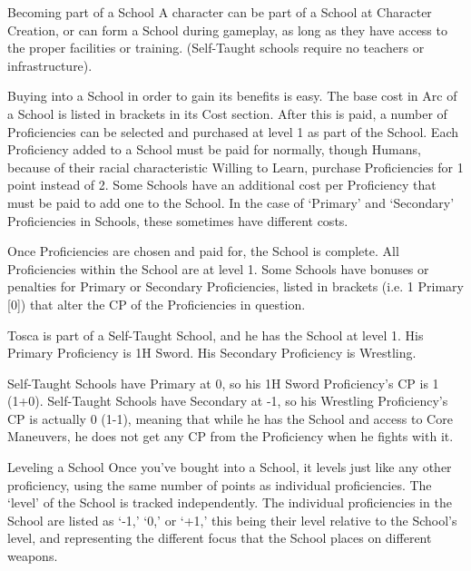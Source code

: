 \documentclass[oneside,11pt,english]{book}
\begin{document}
 

Becoming part of a School 
A character can be part of a School at Character Creation, or can form a School during gameplay, as long 
as they have access to the proper facilities or training. (Self-Taught schools require no teachers or 
infrastructure). 

 

Buying into a School in order to gain its benefits is easy. The base cost in Arc of a School is listed in 
brackets in its Cost section. After this is paid, a number of Proficiencies can be selected and purchased at 
level 1 as part of the School. Each Proficiency added to a School must be paid for normally, though 
Humans, because of their racial characteristic Willing to Learn, purchase Proficiencies for 1 point instead 
of 2. Some Schools have an additional cost per Proficiency that must be paid to add one to the School. In 
the case of ‘Primary’ and ‘Secondary’ Proficiencies in Schools, these sometimes have different costs. 

 

Once Proficiencies are chosen and paid for, the School is complete. All Proficiencies within the School 
are at level 1. Some Schools have bonuses or penalties for Primary or Secondary Proficiencies, listed in 
brackets (i.e. 1 Primary [0]) that alter the CP of the Proficiencies in question. 

 

Tosca is part of a Self-Taught School, and he has the School at level 1. His Primary Proficiency is 1H 
Sword. His Secondary Proficiency is Wrestling. 

 

Self-Taught Schools have Primary at 0, so his 1H Sword Proficiency’s CP is 1 (1+0). Self-Taught Schools 
have Secondary at -1, so his Wrestling Proficiency’s CP is actually 0 (1-1), meaning that while he has the 
School and access to Core Maneuvers, he does not get any CP from the Proficiency when he fights with 
it. 

 

Leveling a School 
Once you’ve bought into a School, it levels just like any other proficiency, using the same number of 
points as individual proficiencies. The ‘level’ of the School is tracked independently. The individual 
proficiencies in the School are listed as ‘-1,’ ‘0,’ or ‘+1,’ this being their level relative to the School’s 
level, and representing the different focus that the School places on different weapons. 

 
\end{document}
